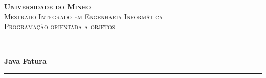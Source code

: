 \begin{titlepage}

\newcommand{\HRule}{\rule{\linewidth}{0.5mm}} %

\center %
 

\textbf{\textsc{\LARGE Universidade do Minho}}\\[1.5cm] %
\textsc{\Large Mestrado Integrado em Engenharia Informática}\\[0.5cm] %
\textsc{\large Programação orientada a objetos}\\[0.5cm] %


\HRule \\[0.4cm]
{ \huge \bfseries Java Fatura}\\[0.4cm] %
\HRule \\[1.5cm]
 



\end{titlepage}
